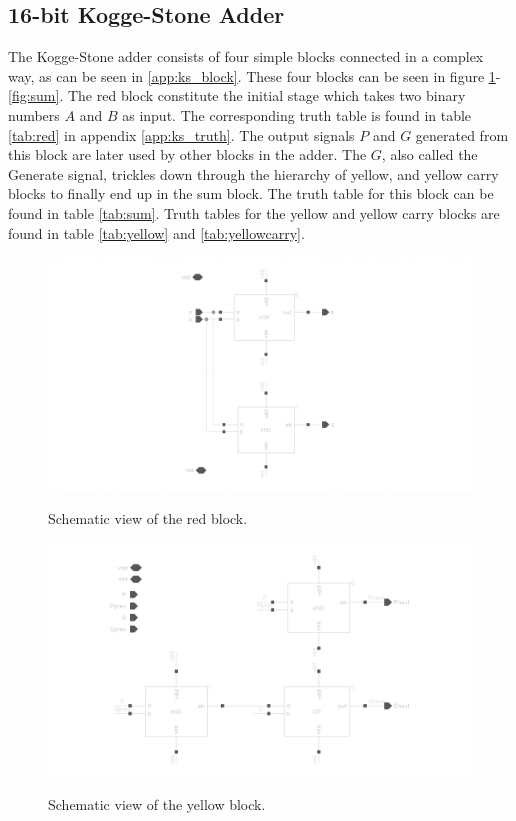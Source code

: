 \subsection{16-bit Kogge-Stone Adder}
The Kogge-Stone adder consists of four simple blocks connected in a complex way, as can be seen in \ref{app:ks_block}. These four blocks can be seen in figure \ref{fig:red}-\ref{fig:sum}. The red block constitute the initial stage which takes two binary numbers $A$ and $B$ as input. The corresponding truth table is found in table \ref{tab:red} in appendix \ref{app:ks_truth}. The output signals $P$ and $G$ generated from this block are later used by other blocks in the adder. The $G$, also called the Generate signal, trickles down through the hierarchy of yellow, and yellow carry blocks to finally end up in the sum block. The truth table for this block can be found in table \ref{tab:sum}. Truth tables for the yellow and yellow carry blocks are found in table \ref{tab:yellow} and \ref{tab:yellowcarry}.

\begin{figure}[H]
  \centering
  \captionsetup{justification=centering}
  {\includegraphics[width=2.0\textwidth]{../figures/red}}
  \caption{Schematic view of the red block.} \label{fig:red}
\end{figure}

\begin{figure}[H]
  \centering
  \captionsetup{justification=centering}
  {\includegraphics[width=1.3\textwidth]{../figures/yellow}}
  \caption{Schematic view of the yellow block.} \label{fig:yellow}
\end{figure}

